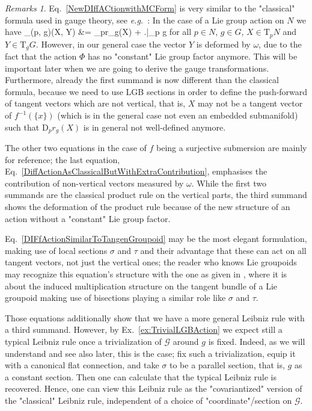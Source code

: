 \documentclass[a4paper,oneside,11pt,bibliography=totoc]{scrartcl}
\makeatletter
\def\oversortoftilde#1{\mathop{\vbox{\m@th\ialign{##\crcr\noalign{\kern3\p@}%
      \sortoftildefill\crcr\noalign{\kern3\p@\nointerlineskip}%
      $\hfil\displaystyle{#1}\hfil$\crcr}}}\limits}
\def\sortoftildefill{$\m@th \setbox\z@\hbox{$\braceld$}%
  \braceld\leaders\vrule \@height\ht\z@ \@depth\z@\hfill\braceru$}
\def\bas#1\eas{\begin{align*}#1\end{align*}}
\theoremstyle{plain}
\theoremstyle{remark}
\newtheorem{remark}[theorem]{Remarks}
\theoremstyle{definition}
\makeatother
\begin{document}
\begin{remark}
\leavevmode\newline
Eq.\ \eqref{NewDIffACtionwithMCForm} is very similar to the "classical" formula used in gauge theory, see \textit{e.g.}\ \cite[\S 3.5, Prop.\ 3.5.4, page 146]{Hamilton}: In the case of a Lie group action on $N$ we have
\bas
\mathrm{D}_{(p, g)}\Phi(X, Y)
&=
_pr_g(X)
	+ \mleft.\oversortoftilde{(\mu_G)_g(Y)}\mright|_{p \cdot g}
\eas
for all $p \in N$, $g \in G$, $X \in \mathrm{T}_pN$ and $Y \in \mathrm{T}_g G$.
However, in our general case the vector $Y$ is deformed by $\omega$, due to the fact that the action $\Phi$ has no "constant" Lie group factor anymore. This will be important later when we are going to derive the gauge transformations. Furthermore, already the first summand is now different than the classical formula, because we need to use LGB sections in order to define the push-forward of tangent vectors which are not vertical, that is, $X$ may not be a tangent vector of $f^{-1}(\{x\})$ (which is in the general case not even an embedded submanifold) such that $\mathrm{D}_p r_g(X)$ is in general not well-defined anymore.

The other two equations in the case of $f$ being a surjective submersion are mainly for reference; the last equation, Eq.\ \eqref{DiffActionAsClassicalButWithExtraContribution}, emphasises the contribution of non-vertical vectors measured by $\omega$. While the first two summands are the classical product rule on the vertical parts, the third summand shows the deformation of the product rule because of the new structure of an action without a "constant" Lie group factor.

Eq.\ \eqref{DIFfActionSimilarToTangenGroupoid} may be the most elegant formulation, making use of local sections $\sigma$ and $\tau$ and their advantage that these can act on all tangent vectors, not just the vertical ones; the reader who knows Lie groupoids may recognize this equation's structure with the one as given in \cite[\S 1.4, Thm.\ 1.4.14, page 28]{mackenzieGeneralTheory}, where it is about the induced multiplication structure on the tangent bundle of a Lie groupoid making use of bisections playing a similar role like $\sigma$ and $\tau$.

Those equations additionally show that we have a more general Leibniz rule with a third summand. However, by Ex.\ \ref{ex:TrivialLGBAction} we expect still a typical Leibniz rule once a trivialization of $\mathcal{G}$ around $g$ is fixed. Indeed, as we will understand and see also later, this is the case; fix such a trivialization, equip it with a canonical flat connection, and take $\sigma$ to be a parallel section, that is, $g$ as a constant section. Then one can calculate that the typical Leibniz rule is recovered. Hence, one can view this Leibniz rule as the "covariantized" version of the "classical" Leibniz rule, independent of a choice of "coordinate"/section on $\mathcal{G}$. 
\end{remark}
\end{document}
